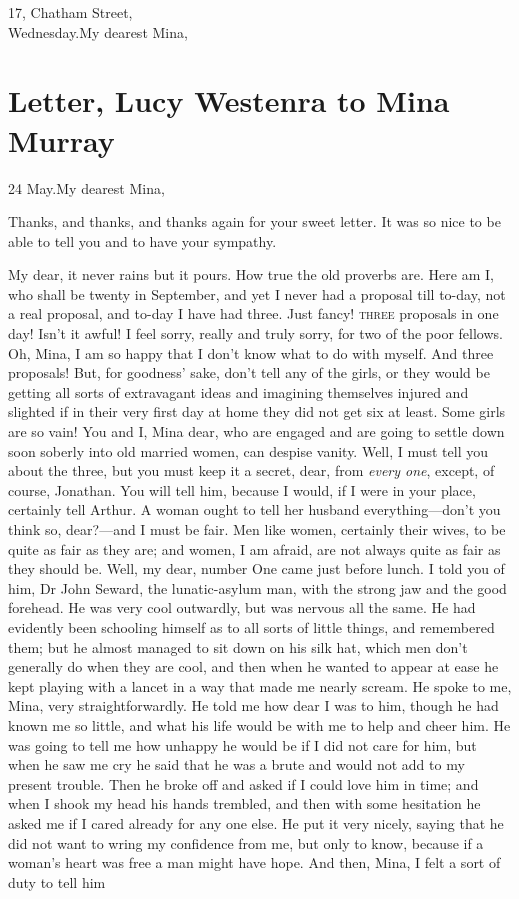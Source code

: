 \begin{mail}{17, Chatham Street,\\Wednesday.}{My dearest Mina,}
\end{mail}



\section{Letter, Lucy Westenra to Mina Murray}

\begin{mail}{24 May.}{My dearest Mina,}

	
Thanks, and thanks, and thanks again for your sweet letter. It was so nice to be able to tell you and to have your sympathy.

My dear, it never rains but it pours. How true the old proverbs are. Here am I, who shall be twenty in September, and yet I never had a proposal till to-day, not a real proposal, and to-day I have had three. Just fancy! \textsc{three} proposals in one day! Isn't it awful! I feel sorry, really and truly sorry, for two of the poor fellows. Oh, Mina, I am so happy that I don't know what to do with myself. And three proposals! But, for goodness' sake, don't tell any of the girls, or they would be getting all sorts of extravagant ideas and imagining themselves injured and slighted if in their very first day at home they did not get six at least. Some girls are so vain! You and I, Mina dear, who are engaged and are going to settle down soon soberly into old married women, can despise vanity. Well, I must tell you about the three, but you must keep it a secret, dear, from \textit{every one}, except, of course, Jonathan. You will tell him, because I would, if I were in your place, certainly tell Arthur. A woman ought to tell her husband everything—don't you think so, dear?—and I must be fair. Men like women, certainly their wives, to be quite as fair as they are; and women, I am afraid, are not always quite as fair as they should be. Well, my dear, number One came just before lunch. I told you of him, Dr John Seward, the lunatic-asylum man, with the strong jaw and the good forehead. He was very cool outwardly, but was nervous all the same. He had evidently been schooling himself as to all sorts of little things, and remembered them; but he almost managed to sit down on his silk hat, which men don't generally do when they are cool, and then when he wanted to appear at ease he kept playing with a lancet in a way that made me nearly scream. He spoke to me, Mina, very straightforwardly. He told me how dear I was to him, though he had known me so little, and what his life would be with me to help and cheer him. He was going to tell me how unhappy he would be if I did not care for him, but when he saw me cry he said that he was a brute and would not add to my present trouble. Then he broke off and asked if I could love him in time; and when I shook my head his hands trembled, and then with some hesitation he asked me if I cared already for any one else. He put it very nicely, saying that he did not want to wring my confidence from me, but only to know, because if a woman's heart was free a man might have hope. And then, Mina, I felt a sort of duty to tell him 
\end{mail}
